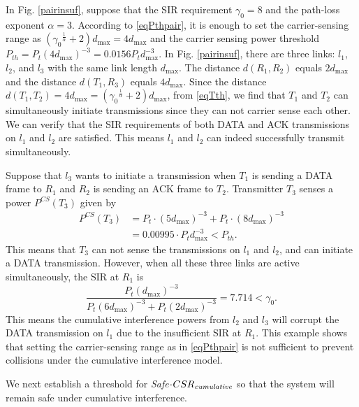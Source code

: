 \documentclass[conference]{IEEEtran}
\begin{document}
In Fig. \ref{pairinsuf}, suppose that the SIR requirement
$\gamma_0=8$ and the path-loss exponent $\alpha=3$. According to
\eqref{eqPthpair}, it is enough to set the carrier-sensing range as
$\left({\gamma_0}^{\frac{1}{\alpha }}+2 \right)d_{\max}=4d_{\max}$
and the carrier sensing power threshold
$P_{th}=P_t\left(4d_{\max}\right)^{-3}= 0.0156 P_td_{\max}^{-3}$. In
Fig. \ref{pairinsuf}, there are three links: $l_1$, $l_2$, and $l_3$
with the same link length $d_{\max}$. The distance $d(R_1,R_2)$
equals $2d_{\max}$ and the distance $d(T_1,R_3)$ equals $4d_{\max}$.
Since the distance
$d(T_1,T_2)=4d_{\max}=\left({\gamma_0}^{\frac{1}{\alpha }}+2
\right)d_{\max}$, from \eqref{eqTth}, we f\/ind that $T_1$ and $T_2$
can simultaneously initiate transmissions since they can not carrier
sense each other. We can verify that the SIR requirements of both
DATA and ACK transmissions on $l_1$ and $l_2$ are satisf\/ied. This
means $l_1$ and $l_2$ can indeed successfully transmit
simultaneously.

Suppose that $l_3$ wants to initiate a transmission when $T_1$ is
sending a DATA frame to $R_1$ and $R_2$ is sending an ACK frame to
$T_2$. Transmitter $T_3$ senses a power $P^{CS}(T_3)$ given by
\begin{align}
P^{CS}(T_3)&=P_t\cdot(5d_{\max})^{-3}+P_t\cdot(8d_{\max})^{-3}\nonumber\\
&=0.00995\cdot P_td_{\max}^{-3}<P_{th}.\nonumber
\end{align}
This means that $T_3$ can not sense the transmissions on $l_1$ and
$l_2$, and can initiate a DATA transmission. However, when all these
three links are active simultaneously, the SIR at $R_1$ is
\begin{equation}
\frac{P_t(d_{\max})^{-3}}{{P_t(6d_{\max})^{-3}}+{P_t(2d_{\max})^{-3}}
}=7.714< {\gamma}_0.\nonumber
\end{equation}
This means the cumulative interference powers from $l_2$ and $l_3$
will corrupt the DATA transmission on $l_1$ due to the
insuff\/icient SIR at $R_1$. This example shows that setting the
carrier-sensing range as in \eqref{eqPthpair} is not suff\/icient to
prevent collisions under the cumulative interference model.





We next establish a threshold for
\emph{Safe-}$CSR_{\text{\emph{cumulative}}}$ so that the system will
remain safe under cumulative interference.
\end{document}
